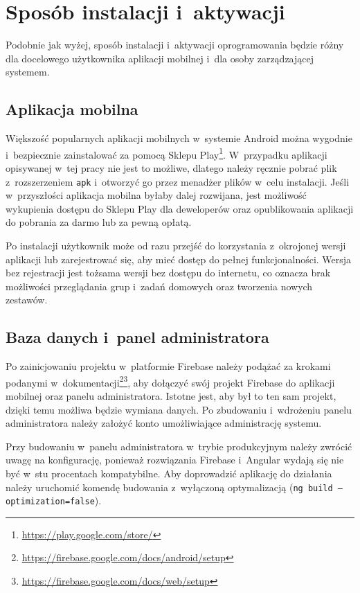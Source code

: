 \documentclass[a4paper,twoside,12pt]{book}
\begin{document}
\section{Sposób instalacji i~aktywacji}

Podobnie jak wyżej, sposób instalacji i~aktywacji oprogramowania będzie różny dla docelowego użytkownika aplikacji mobilnej i~dla osoby zarządzającej systemem. 

\subsection{Aplikacja mobilna}
Większość popularnych aplikacji mobilnych w~systemie Android można wygodnie i~bezpiecznie zainstalować za pomocą Sklepu Play\footnote{\url{https://play.google.com/store/}}. W~przypadku aplikacji opisywanej w~tej pracy nie jest to możliwe, dlatego należy ręcznie pobrać plik z~rozszerzeniem \texttt{apk} i~otworzyć go przez menadżer plików w~celu instalacji. Jeśli w~przyszłości aplikacja mobilna byłaby dalej rozwijana, jest możliwość wykupienia dostępu do Sklepu Play dla deweloperów oraz opublikowania aplikacji do pobrania za darmo lub za pewną opłatą. 

Po instalacji użytkownik może od razu przejść do korzystania z~okrojonej wersji aplikacji lub zarejestrować się, aby mieć dostęp do pełnej funkcjonalności. Wersja bez rejestracji jest tożsama wersji bez dostępu do internetu, co oznacza brak możliwości przeglądania grup i~zadań domowych oraz tworzenia nowych zestawów.

\subsection{Baza danych i~panel administratora}

Po zainicjowaniu projektu w~platformie Firebase należy podążać za krokami podanymi w~dokumentacji\footnote{\url{https://firebase.google.com/docs/android/setup}}\footnote{\url{https://firebase.google.com/docs/web/setup}}, aby dołączyć swój projekt Firebase do aplikacji mobilnej oraz panelu administratora. Istotne jest, aby był to ten sam projekt, dzięki temu możliwa będzie wymiana danych. Po zbudowaniu i~wdrożeniu panelu administratora należy założyć konto umożliwiające administrację systemu. 

Przy budowaniu w~panelu administratora w~trybie produkcyjnym należy zwrócić uwagę na konfigurację, ponieważ rozwiązania Firebase i~Angular wydają się nie być w~stu procentach kompatybilne. Aby doprowadzić aplikację do działania należy uruchomić komendę budowania z~wyłączoną optymalizacją (\texttt{ng build --optimization=false}).
\end{document}
